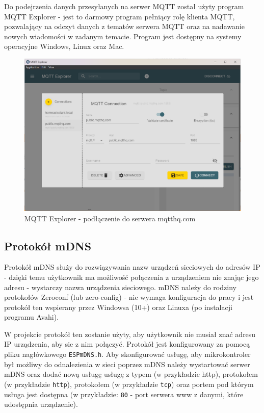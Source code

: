 \documentclass[12pt,a4paper]{article}
\begin{document}
Do podejrzenia danych przesyłanych na serwer MQTT został użyty program MQTT Explorer - jest to darmowy program pełniący rolę klienta MQTT, pozwalający na odczyt danych z tematów serwera MQTT oraz na nadawanie nowych wiadomości w zadanym temacie. Program jest dostępny na systemy operacyjne Windows, Linux oraz Mac.

\begin{figure}[H]
    \centering
    \includegraphics[width=\textwidth]{mqtt-explorer.png}
    \caption{MQTT Explorer - podłączenie do serwera mqtthq.com}
\end{figure}

\subsection{Protokół mDNS}

Protokół mDNS służy do rozwiązywania nazw urządzeń sieciowych do adresów IP - dzięki temu użytkownik ma możliwość połączenia z urządzeniem nie znając jego adresu - wystarczy nazwa urządzenia sieciowego. mDNS należy do rodziny protokołów Zeroconf (lub zero-config)\cite{zeroconf-explanation} - nie wymaga konfiguracja do pracy 
i jest protokół ten wspierany przez Windowsa (10+) oraz Linuxa (po instalacji programu Avahi).

W projekcie protokół ten zostanie użyty, aby użytkownik nie musiał znać adresu IP urządzenia, aby sie z nim połączyć. Protokół jest konfigurowany za pomocą pliku nagłówkowego \texttt{ESPmDNS.h}. Aby skonfigurować usługę, aby mikrokontroler był możliwy do odnalezienia w sieci poprzez mDNS należy wystartować serwer mDNS oraz dodać nową usługę usługę z typem (w przykładzie http), protokołem (w przykładzie  \texttt{http}), protokołem (w przykładzie \texttt{tcp}) 
oraz portem pod którym usługa jest dostępna (w przykładzie: \texttt{80} - port serwera www z danymi, które udostępnia urządzenie).
\end{document}
